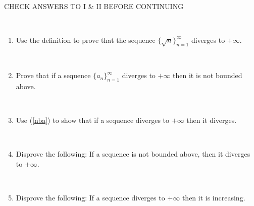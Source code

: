 \documentclass[12pt]{amsart}
\begin{document}
\

\noindent \hrulefill

CHECK ANSWERS TO I \& II BEFORE CONTINUING

\noindent \hrulefill

\

\begin{enumerate}



\item Use the definition to prove that the sequence $\{ \sqrt{n} \}_{n=1}^\infty$ diverges to $+\infty$.

\



\item\label{nba} Prove that if a sequence $\{ a_n\}_{n=1}^\infty$ diverges to $+\infty$ then it is not bounded above. 

\

\item Use (\ref{nba}) to show that if a sequence diverges to $+\infty$ then it diverges.

\

\item Disprove the following: If a sequence is not bounded above, then it diverges to $+\infty$.

\

\item Disprove the following: If a sequence diverges to $+\infty$ then it is increasing.


\end{enumerate}
\end{document}
